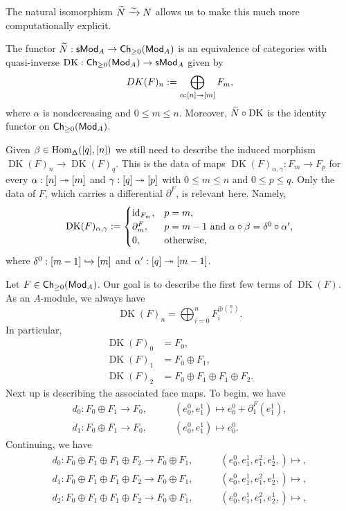 \documentclass[11pt]{article}
\DeclareMathOperator{\DDelta}{\mathsf{\Delta}} %
\DeclareMathOperator{\DK}{DK} %
\begin{document}
The natural isomorphism $\widetilde{N}\xrightarrow{\sim}N$ allows us to make this much more computationally explicit.

\begin{theorem}
The functor $\widetilde{N}: \operatorname{\mathsf{s}\!}\operatorname{\mathsf{Mod}}_A\to\operatorname{\mathsf{Ch}}_{\geq0}(\operatorname{\mathsf{Mod}}_A)$ is an equivalence of categories with quasi-inverse $\DK: \Ch_{\geq0}(\Mod_A)\to\simp\Mod_A$ given by 
$$DK(F)_n:=\bigoplus_{\alpha: [n]\twoheadrightarrow[m]}F_m,$$
where $\alpha$ is nondecreasing and $0\leq m\leq n$. Moreover, $\twid{N}\circ\DK$ is the identity functor on $\operatorname{\mathsf{Ch}}_{\geq0}(\operatorname{\mathsf{Mod}}_A)$.
\end{theorem}

Given $\beta\in\Hom_{\DDelta}([q],[n])$ we still need to describe the induced morphism $\DK(F)_n\to\DK(F)_q$. This is the data of maps $\DK(F)_{\alpha,\gamma}: F_m\to F_p$ for every $\alpha: [n]\twoheadrightarrow[m]$ and $\gamma: [q]\twoheadrightarrow[p]$ with $0\leq m\leq n$ and $0\leq p\leq q$. Only the data of $F$, which carries a differential $\partial^F$, is relevant here. Namely,
\begin{equation*}
\DK(F)_{\alpha,\gamma}:=
\begin{cases}
\id_{F_m}, & p=m, \\
\partial_m^F, & p=m-1\textrm{ and }\alpha\circ\beta=\delta^0\circ\alpha', \\
0, & \textrm{otherwise},
\end{cases}
\end{equation*}
where $\delta^0: [m-1]\hookrightarrow[m]$ and $\alpha': [q]\twoheadrightarrow[m-1]$.

\begin{example}
Let $F\in\operatorname{\mathsf{Ch}}_{\geq0}(\operatorname{\mathsf{Mod}}_A)$. Our goal is to describe the first few terms of $\DK(F)$. As an $A$-module, we always have 
$$\DK(F)_n=\bigoplus_{i=0}^nF_i^{\oplus\binom{n}{i}}.$$
In particular,
\begin{align*}
\DK(F)_0&=F_0, \\
\DK(F)_1&=F_0\oplus F_1, \\
\DK(F)_2&=F_0\oplus F_1\oplus F_1\oplus F_2.
\end{align*}
Next up is describing the associated face maps. To begin, we have 
\begin{align*}
d_0: F_0\oplus F_1\to F_0,\qquad &(e_0^0,e_1^1)\mapsto e_0^0+\partial_1^F(e_1^1), \\
d_1: F_0\oplus F_1\to F_0,\qquad &(e_0^0,e_1^1)\mapsto e_0^0.
\end{align*}
Continuing, we have 
\begin{align*}
d_0: F_0\oplus F_1\oplus F_1\oplus F_2\to F_0\oplus F_1,\qquad &(e_0^0,e_1^1,e_1^2,e_2^1,)\mapsto, \\
d_1: F_0\oplus F_1\oplus F_1\oplus F_2\to F_0\oplus F_1,\qquad &(e_0^0,e_1^1,e_1^2,e_2^1,)\mapsto, \\
d_2: F_0\oplus F_1\oplus F_1\oplus F_2\to F_0\oplus F_1,\qquad &(e_0^0,e_1^1,e_1^2,e_2^1,)\mapsto, \\
\end{align*}
\end{example}
\end{document}
